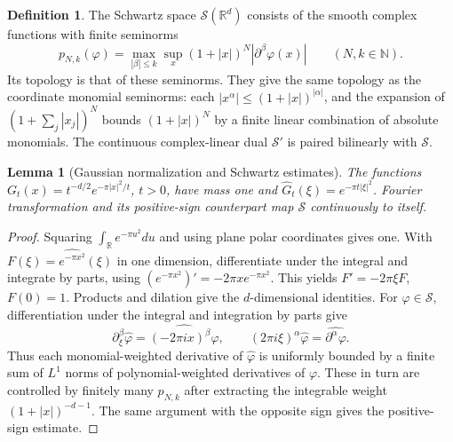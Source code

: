 \documentclass[11pt,oneside,openany]{book}
\newtheorem{lemma}[theorem]{Lemma}
\theoremstyle{definition}
\newtheorem{definition}[theorem]{Definition}
\theoremstyle{remark}
\begin{document}
\begin{definition}
The Schwartz space \(\mathcal S(\mathbb R^d)\) consists of the smooth complex functions with finite seminorms
\[
 p_{N,k}(\varphi)=\max_{|\beta|\le k}\sup_x(1+|x|)^N|\partial^\beta\varphi(x)|
 \qquad(N,k\in\mathbb N).
\]
Its topology is that of these seminorms. They give the same topology as the coordinate monomial seminorms: each \(|x^\alpha|\le(1+|x|)^{|\alpha|}\), and the expansion of \((1+\sum_j|x_j|)^N\) bounds \((1+|x|)^N\) by a finite linear combination of absolute monomials. The continuous complex-linear dual \(\mathcal S'\) is paired bilinearly with \(\mathcal S\).
\end{definition}

\begin{lemma}[Gaussian normalization and Schwartz estimates]
\label{p102:fourier-gaussian}
The functions \(G_t(x)=t^{-d/2}e^{-\pi|x|^2/t}\), \(t>0\), have mass one and \(\widehat G_t(\xi)=e^{-\pi t|\xi|^2}\). Fourier transformation and its positive-sign counterpart map \(\mathcal S\) continuously to itself.
\end{lemma}
\begin{proof}
Squaring \(\int_\mathbb R e^{-\pi u^2}du\) and using plane polar coordinates gives one. With \(F(\xi)=\widehat{e^{-\pi x^2}}(\xi)\) in one dimension, differentiate under the integral and integrate by parts, using \((e^{-\pi x^2})'=-2\pi x e^{-\pi x^2}\). This yields \(F'=-2\pi\xi F\), \(F(0)=1\). Products and dilation give the \(d\)-dimensional identities. For \(\varphi\in\mathcal S\), differentiation under the integral and integration by parts give
\[
 \partial_\xi^\beta\widehat\varphi=\widehat{(-2\pi i x)^\beta\varphi},
 \qquad
 (2\pi i\xi)^\alpha\widehat\varphi=\widehat{\partial^\alpha\varphi}.
\]
Thus each monomial-weighted derivative of \(\widehat\varphi\) is uniformly bounded by a finite sum of \(L^1\) norms of polynomial-weighted derivatives of \(\varphi\). These in turn are controlled by finitely many \(p_{N,k}\) after extracting the integrable weight \((1+|x|)^{-d-1}\). The same argument with the opposite sign gives the positive-sign estimate.
\end{proof}
\end{document}
